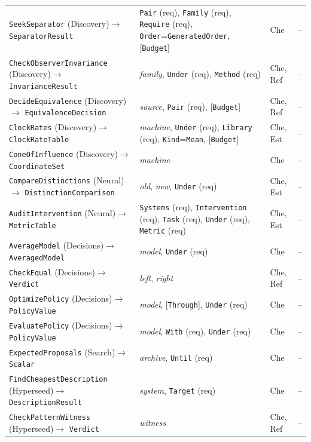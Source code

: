 \documentclass[11pt]{article}
\newcommand{\code}[1]{\texttt{#1}}
\theoremstyle{definition}
\theoremstyle{plain}
\begin{document}
{\begin{longtable}{>{\raggedright\arraybackslash}p{4.4cm}>{\raggedright\arraybackslash}p{6.8cm}>{\raggedright\arraybackslash}p{1.9cm}>{\raggedright\arraybackslash}p{0.5cm}}
\code{SeekSeparator} (Discovery)\newline$\to$ \code{SeparatorResult} & \code{Pair} (req), \code{Family} (req), \code{Require} (req), \code{Order}=\code{GeneratedOrder}, [\code{Budget}] & Che & --\\
\code{CheckObserverInvariance} (Discovery)\newline$\to$ \code{InvarianceResult} & \emph{family}, \code{Under} (req), \code{Method} (req) & Che, Ref & --\\
\code{DecideEquivalence} (Discovery)\newline$\to$ \code{EquivalenceDecision} & \emph{source}, \code{Pair} (req), [\code{Budget}] & Che, Ref & --\\
\code{ClockRates} (Discovery)\newline$\to$ \code{ClockRateTable} & \emph{machine}, \code{Under} (req), \code{Library} (req), \code{Kind}=\code{Mean}, [\code{Budget}] & Che, Est & --\\
\code{ConeOfInfluence} (Discovery)\newline$\to$ \code{CoordinateSet} & \emph{machine} & Che & --\\
\code{CompareDistinctions} (Neural)\newline$\to$ \code{DistinctionComparison} & \emph{old}, \emph{new}, \code{Under} (req) & Che, Est & --\\
\code{AuditIntervention} (Neural)\newline$\to$ \code{MetricTable} & \code{Systems} (req), \code{Intervention} (req), \code{Task} (req), \code{Under} (req), \code{Metric} (req) & Che, Est & --\\
\code{AverageModel} (Decisions)\newline$\to$ \code{AveragedModel} & \emph{model}, \code{Under} (req) & Che & --\\
\code{CheckEqual} (Decisions)\newline$\to$ \code{Verdict} & \emph{left}, \emph{right} & Che, Ref & --\\
\code{OptimizePolicy} (Decisions)\newline$\to$ \code{PolicyValue} & \emph{model}, [\code{Through}], \code{Under} (req) & Che & --\\
\code{EvaluatePolicy} (Decisions)\newline$\to$ \code{PolicyValue} & \emph{model}, \code{With} (req), \code{Under} (req) & Che & --\\
\code{ExpectedProposals} (Search)\newline$\to$ \code{Scalar} & \emph{archive}, \code{Until} (req) & Che & --\\
\code{FindCheapestDescription} (Hyperseed)\newline$\to$ \code{DescriptionResult} & \emph{system}, \code{Target} (req) & Che & --\\
\code{CheckPatternWitness} (Hyperseed)\newline$\to$ \code{Verdict} & \emph{witness} & Che, Ref & --\\
\bottomrule\end{longtable}}
\end{document}
